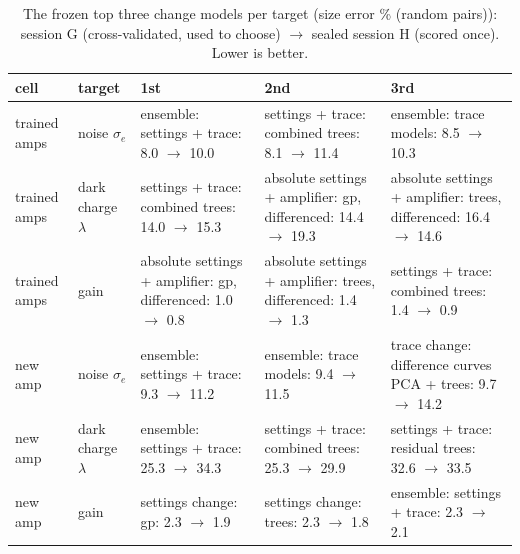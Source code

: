 \begin{table}[H]\centering\scriptsize
\caption{The frozen top three change models per target (size error \% (random pairs)): session G (cross-validated, used to choose) $\to$ sealed session H (scored once). Lower is better.}
\begin{tabular}{llp{4cm}p{4cm}p{4cm}}\toprule
cell & target & 1st & 2nd & 3rd\\\midrule
trained amps & noise $\sigma_e$ & ensemble: settings + trace: 8.0 $\to$ 10.0 & settings + trace: combined trees: 8.1 $\to$ 11.4 & ensemble: trace models: 8.5 $\to$ 10.3\\
trained amps & dark charge $\lambda$ & settings + trace: combined trees: 14.0 $\to$ 15.3 & absolute settings + amplifier: gp, differenced: 14.4 $\to$ 19.3 & absolute settings + amplifier: trees, differenced: 16.4 $\to$ 14.6\\
trained amps & gain & absolute settings + amplifier: gp, differenced: 1.0 $\to$ 0.8 & absolute settings + amplifier: trees, differenced: 1.4 $\to$ 1.3 & settings + trace: combined trees: 1.4 $\to$ 0.9\\
new amp & noise $\sigma_e$ & ensemble: settings + trace: 9.3 $\to$ 11.2 & ensemble: trace models: 9.4 $\to$ 11.5 & trace change: difference curves PCA + trees: 9.7 $\to$ 14.2\\
new amp & dark charge $\lambda$ & ensemble: settings + trace: 25.3 $\to$ 34.3 & settings + trace: combined trees: 25.3 $\to$ 29.9 & settings + trace: residual trees: 32.6 $\to$ 33.5\\
new amp & gain & settings change: gp: 2.3 $\to$ 1.9 & settings change: trees: 2.3 $\to$ 1.8 & ensemble: settings + trace: 2.3 $\to$ 2.1\\
\bottomrule\end{tabular}\end{table}

